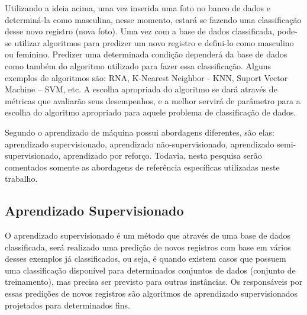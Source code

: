 Utilizando a ideia acima, uma vez inserida uma foto no banco de dados e determiná-la como masculina, nesse momento, estará se fazendo uma classificação desse novo registro (nova foto). Uma vez com a base de dados classificada, pode-se utilizar algoritmos para predizer um novo registro e defini-lo como masculino ou feminino. Predizer uma determinada condição dependerá da base de dados como também do algoritmo utilizado para fazer essa classificação. Alguns exemplos de algoritmos são: RNA, K-Nearest Neighbor - KNN, Suport Vector Machine – SVM, etc. A escolha apropriada do algoritmo se dará através de métricas que avaliarão seus desempenhos, e a melhor servirá de parâmetro para a escolha do algoritmo apropriado para aquele problema de classificação de dados. 


Segundo \cite{Mohri2012} o aprendizado de máquina possui abordagens diferentes, são elas: aprendizado supervisionado, aprendizado não-supervisionado, aprendizado semi-supervisionado, aprendizado por reforço. Todavia, nesta pesquisa serão comentados somente as abordagens de referência específicas utilizadas neste trabalho.

\subsection{Aprendizado Supervisionado}\label{cap:refTeor:ssec:aprendSup}

O aprendizado supervisionado é um método que através de uma base de dados classificada, será realizado uma predição de novos registros com base em vários desses exemplos já classificados, ou seja, é quando existem casos que possuem uma classificação disponível para determinados conjuntos de dados (conjunto de treinamento), mas precisa ser previsto para outras instâncias. Os responsáveis por essas predições de novos registros são algoritmos de aprendizado supervisionados projetados para determinados fins.

